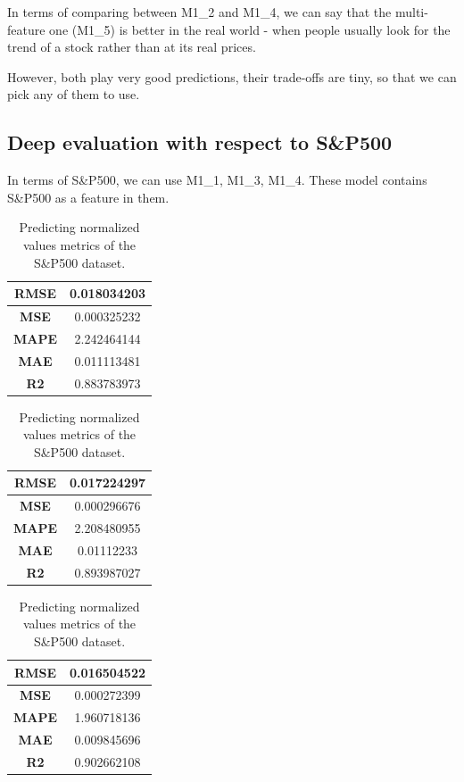 In terms of comparing between M1\_2 and M1\_4, we can say that the multi-feature
one (M1\_5) is better in the real world - when people usually look for the trend
of a stock rather than at its real prices.

However, both play very good predictions, their trade-offs are tiny, so that we can
pick any of them to use.

\subsection{Deep evaluation with respect to S\&P500}
In terms of S\&P500, we can use M1\_1, M1\_3, M1\_4. These model contains
S\&P500 as a feature in them.

\begin{table}[H]
	\centering
	\begin{minipage}{0.3\textwidth}
		\centering
		\begin{tabular}{|c|c|}
			\hline
			\textbf{RMSE} & 0.018034203 \\
			\hline
			\textbf{MSE}  & 0.000325232 \\
			\hline
			\textbf{MAPE} & 2.242464144 \\
			\hline
			\textbf{MAE}  & 0.011113481 \\
			\hline
			\textbf{R2}   & 0.883783973 \\
			\hline
		\end{tabular}
	\end{minipage}
	\begin{minipage}{0.3\textwidth}
		\centering
		\begin{tabular}{|c|c|}
			\hline
			\textbf{RMSE} & 0.017224297 \\
			\hline
			\textbf{MSE}  & 0.000296676 \\
			\hline
			\textbf{MAPE} & 2.208480955 \\
			\hline
			\textbf{MAE}  & 0.01112233  \\
			\hline
			\textbf{R2}   & 0.893987027 \\
			\hline
		\end{tabular}
	\end{minipage}
	\begin{minipage}{0.3\textwidth}
		\centering
		\begin{tabular}{|c|c|}
			\hline
			\textbf{RMSE} & 0.016504522 \\
			\hline
			\textbf{MSE}  & 0.000272399 \\
			\hline
			\textbf{MAPE} & 1.960718136 \\
			\hline
			\textbf{MAE}  & 0.009845696 \\
			\hline
			\textbf{R2}   & 0.902662108 \\
			\hline
		\end{tabular}
	\end{minipage}
	\caption{Predicting normalized values metrics of the S\&P500 dataset.}
	\label{metric:sp_nor}
\end{table}

